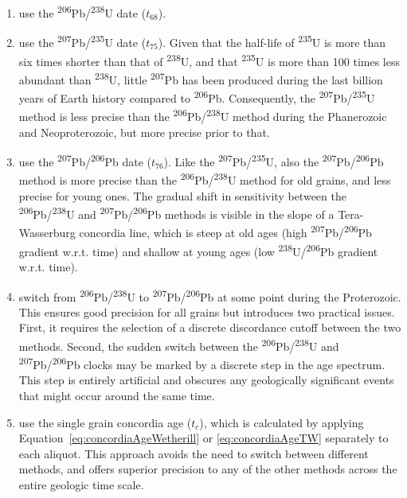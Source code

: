 \begin{refsection}
\begin{enumerate}
\item use the \textsuperscript{206}Pb/\textsuperscript{238}U date
  ($t_{68}$).
\item use the \textsuperscript{207}Pb/\textsuperscript{235}U date
  ($t_{75}$).  Given that the half-life of \textsuperscript{235}U is
  more than six times shorter than that of \textsuperscript{238}U, and
  that \textsuperscript{235}U is more than 100 times less abundant
  than \textsuperscript{238}U, little \textsuperscript{207}Pb has been
  produced during the last billion years of Earth history compared to
  \textsuperscript{206}Pb. Consequently, the
  \textsuperscript{207}Pb/\textsuperscript{235}U method is less
  precise than the \textsuperscript{206}Pb/\textsuperscript{238}U
  method during the Phanerozoic and Neoproterozoic, but more precise
  prior to that.
\item use the \textsuperscript{207}Pb/\textsuperscript{206}Pb date
  ($t_{76}$).  Like the
  \textsuperscript{207}Pb/\textsuperscript{235}U, also the
  \textsuperscript{207}Pb/\textsuperscript{206}Pb method is more
  precise than the \textsuperscript{206}Pb/\textsuperscript{238}U
  method for old grains, and less precise for young ones.  The gradual
  shift in sensitivity between the
  \textsuperscript{206}Pb/\textsuperscript{238}U and
  \textsuperscript{207}Pb/\textsuperscript{206}Pb methods is visible
  in the slope of a Tera-Wasserburg concordia line, which is steep at
  old ages (high \textsuperscript{207}Pb/\textsuperscript{206}Pb
  gradient w.r.t. time) and shallow at young ages (low
  \textsuperscript{238}U/\textsuperscript{206}Pb gradient
  w.r.t. time).
\item switch from \textsuperscript{206}Pb/\textsuperscript{238}U to
  \textsuperscript{207}Pb/\textsuperscript{206}Pb at some point during
  the Proterozoic. This ensures good precision for all grains but
  introduces two practical issues. First, it requires the selection of
  a discrete discordance cutoff between the two methods.  Second, the
  sudden switch between the
  \textsuperscript{206}Pb/\textsuperscript{238}U and
  \textsuperscript{207}Pb/\textsuperscript{206}Pb clocks may be marked
  by a discrete step in the age spectrum. This step is entirely
  artificial and obscures any geologically significant events that
  might occur around the same time.
\item use the single grain concordia age ($t_c$), which is calculated
  by applying Equation~\ref{eq:concordiaAgeWetherill} or
  \ref{eq:concordiaAgeTW} separately to each aliquot. This approach
  avoids the need to switch between different methods, and offers
  superior precision to any of the other methods across the entire
  geologic time scale.
\end{enumerate}


\end{refsection}
